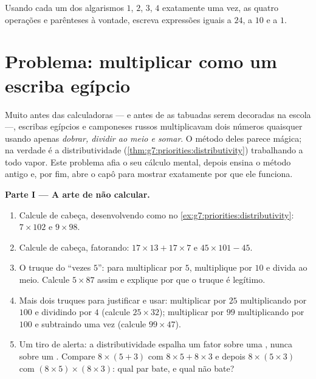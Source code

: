 \begin{exercise}[$\star\star\star$]\label{exo:g7:priorities:11}
Usando cada um dos algarismos $1$, $2$, $3$, $4$ exatamente uma vez, as
quatro operações e parênteses à vontade, escreva expressões iguais a
$24$, a $10$ e a $1$.
\end{exercise}

\section{Problema: multiplicar como um escriba egípcio}

\begin{problem}
\label{pb:g7:priorities:1}
Muito antes das calculadoras --- e antes de as tabuadas serem
decoradas na escola ---, escribas egípcios e camponeses russos
multiplicavam dois números quaisquer usando apenas \emph{dobrar,
dividir ao meio e somar}. O método deles parece mágica; na verdade é a
distributividade (\cref{thm:g7:priorities:distributivity}) trabalhando
a todo vapor. Este problema afia o seu cálculo mental, depois ensina o
método antigo e, por fim, abre o capô para mostrar exatamente por que
ele funciona.

\medskip
\noindent\textbf{Parte I --- A arte de não calcular.}
\begin{enumerate}
  \item Calcule de cabeça, desenvolvendo como no
        \cref{ex:g7:priorities:distributivity}: $7 \times 102$ e
        $9 \times 98$.
  \item Calcule de cabeça, fatorando: $17 \times 13 + 17 \times 7$ e
        $45 \times 101 - 45$.
  \item O truque do ``vezes $5$'': para multiplicar por $5$,
        multiplique por $10$ e divida ao meio. Calcule $5 \times 87$
        assim e explique por que o truque é legítimo.
  \item Mais dois truques para justificar e usar: multiplicar por $25$
        multiplicando por $100$ e dividindo por $4$ (calcule
        $25 \times 32$); multiplicar por $99$ multiplicando por $100$ e
        subtraindo uma vez (calcule $99 \times 47$).
  \item Um tiro de alerta: a distributividade espalha um fator sobre
        uma \emph{}, nunca sobre um . Compare
        $8 \times (5 + 3)$ com $8 \times 5 + 8 \times 3$ e depois
        $8 \times (5 \times 3)$ com
        $(8 \times 5) \times (8 \times 3)$: qual par bate, e qual não
        bate?
\end{enumerate}


\end{problem}
